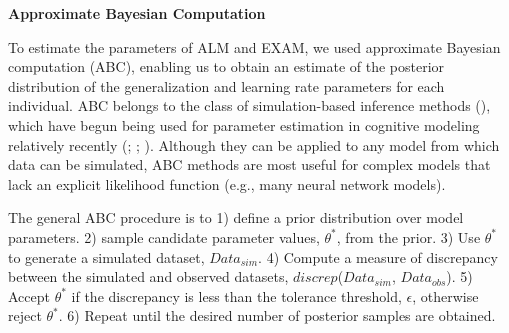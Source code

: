 \documentclass[
  11pt,
  letterpaper,
]{article}
\begin{document}
\begin{tcolorbox}[enhanced jigsaw, opacityback=0, left=2mm, colframe=quarto-callout-color-frame, toprule=.15mm, rightrule=.15mm, leftrule=.75mm, bottomrule=.15mm, arc=.35mm, breakable, colback=white]

\textbf{ Approximate Bayesian Computation}

To estimate the parameters of ALM and EXAM, we used approximate Bayesian
computation (ABC), enabling us to obtain an estimate of the posterior
distribution of the generalization and learning rate parameters for each
individual. ABC belongs to the class of simulation-based inference
methods
(), which have begun being used for parameter estimation in
cognitive modeling relatively recently
(;
; ). Although they can be applied to any model from which
data can be simulated, ABC methods are most useful for complex models
that lack an explicit likelihood function (e.g., many neural network
models).

The general ABC procedure is to 1) define a prior distribution over
model parameters. 2) sample candidate parameter values, \(\theta^*\),
from the prior. 3) Use \(\theta^*\) to generate a simulated dataset,
\(Data_{sim}\). 4) Compute a measure of discrepancy between the
simulated and observed datasets, \(discrep\)(\(Data_{sim}\),
\(Data_{obs}\)). 5) Accept \(\theta^*\) if the discrepancy is less than
the tolerance threshold, \(\epsilon\), otherwise reject \(\theta^*\). 6)
Repeat until the desired number of posterior samples are obtained.


\end{tcolorbox}
\end{document}
